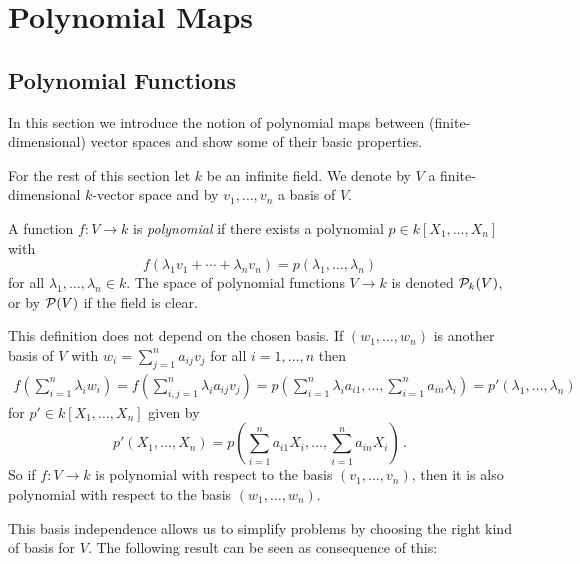 \section{Polynomial Maps}





\subsection{Polynomial Functions}

\begin{fluff}
  In this section we introduce the notion of polynomial maps between (finite-dimensional) vector spaces and show some of their basic properties.
  
  For the rest of this section let $k$ be an infinite field.
  We denote by $V$ a finite-dimensional $k$-vector space and by $v_1, \dotsc, v_n$ a basis of $V$.
\end{fluff}


\begin{definition}
  A function $f \colon V \to k$ is \emph{polynomial} if there exists a polynomial $p \in k[X_1, \dotsc, X_n]$ with
  \[
      f\left( \lambda_1 v_1 + \dotsb + \lambda_n v_n \right)
    = p(\lambda_1, \dotsc, \lambda_n)
  \]
  for all $\lambda_1, \dotsc, \lambda_n \in k$.
  The space of polynomial functions $V \to k$ is denoted $\mathcal{P}_k(V)$, or by $\mathcal{P}(V)$ if the field is clear.
\end{definition}


\begin{fluff}
  This definition does not depend on the chosen basis.
  If $(w_1, \dotsc, w_n)$ is another basis of $V$ with $w_i = \sum_{j=1}^n a_{ij} v_j$ for all $i = 1, \dotsc, n$ then
  \begin{align*}
      f\left( \sum_{i=1}^n \lambda_i w_i \right)
    = f\left( \sum_{i,j=1}^n \lambda_i a_{ij} v_j \right)
    = p
      \left(
        \sum_{i=1}^n \lambda_i a_{i1},
        \dotsc,
        \sum_{i=1}^n a_{in} \lambda_i
      \right)
    =  p'(\lambda_1, \dotsc, \lambda_n)
  \end{align*}
  for $p' \in k[X_1, \dotsc, X_n]$ given by
  \[
      p'(X_1, \dotsc, X_n)
    = p
      \left(
        \sum_{i=1}^n a_{i1} X_i,
        \dotsc,
        \sum_{i=1}^n a_{in} X_i
      \right) \,.
  \]
  So if $f \colon V \to k$ is polynomial with respect to the basis $(v_1, \dotsc, v_n)$, then it is also polynomial with respect to the basis $(w_1, \dotsc, w_n)$.
  
  This basis independence allows us to simplify problems by choosing the right kind of basis for $V$.
  The following result can be seen as consequence of this:
\end{fluff}


